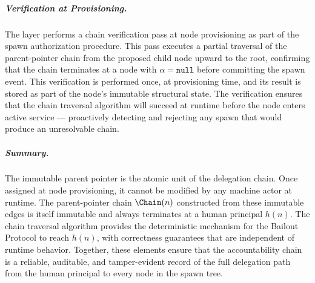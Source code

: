 \subparagraph{Verification at Provisioning.} The \fact{} layer performs a chain verification pass at node provisioning as part of the spawn authorization procedure. This pass executes a partial traversal of the parent-pointer chain from the proposed child node upward to the root, confirming that the chain terminates at a node with $\alpha = \texttt{null}$ before committing the spawn event. This verification is performed once, at provisioning time, and its result is stored as part of the node's immutable structural state. The verification ensures that the chain traversal algorithm will succeed at runtime before the node enters active service --- proactively detecting and rejecting any spawn that would produce an unresolvable chain.

\subparagraph{Summary.} The immutable parent pointer is the atomic unit of the delegation chain. Once assigned at node provisioning, it cannot be modified by any machine actor at runtime. The parent-pointer chain $\Chain(n)$ constructed from these immutable edges is itself immutable and always terminates at a human principal $h(n)$. The chain traversal algorithm provides the deterministic mechanism for the Bailout Protocol to reach $h(n)$, with correctness guarantees that are independent of runtime behavior. Together, these elements ensure that the accountability chain is a reliable, auditable, and tamper-evident record of the full delegation path from the human principal to every node in the spawn tree.